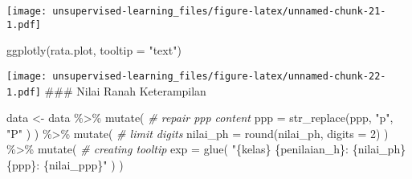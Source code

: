 \documentclass[
]{article}
\newenvironment{Shaded}{\begin{snugshade}}{\end{snugshade}}
\newcommand{\AttributeTok}[1]{\textcolor[rgb]{0.77,0.63,0.00}{#1}}
\newcommand{\CommentTok}[1]{\textcolor[rgb]{0.56,0.35,0.01}{\textit{#1}}}
\newcommand{\DecValTok}[1]{\textcolor[rgb]{0.00,0.00,0.81}{#1}}
\newcommand{\FunctionTok}[1]{\textcolor[rgb]{0.00,0.00,0.00}{#1}}
\newcommand{\NormalTok}[1]{#1}
\newcommand{\OtherTok}[1]{\textcolor[rgb]{0.56,0.35,0.01}{#1}}
\newcommand{\SpecialCharTok}[1]{\textcolor[rgb]{0.00,0.00,0.00}{#1}}
\newcommand{\StringTok}[1]{\textcolor[rgb]{0.31,0.60,0.02}{#1}}
\begin{document}
\texttt{[image: unsupervised-learning\_files/figure-latex/unnamed-chunk-21-1.pdf]}

\begin{Shaded}
\begin{Highlighting}[]
\FunctionTok{ggplotly}\NormalTok{(rata.plot, }\AttributeTok{tooltip =} \StringTok{"text"}\NormalTok{)}
\end{Highlighting}
\end{Shaded}

\texttt{[image: unsupervised-learning\_files/figure-latex/unnamed-chunk-22-1.pdf]}
\#\#\# Nilai Ranah Keterampilan

\begin{Shaded}
\begin{Highlighting}[]
\NormalTok{data }\OtherTok{\textless{}{-}}\NormalTok{ data }\SpecialCharTok{\%\textgreater{}\%} 
  \FunctionTok{mutate}\NormalTok{( }\CommentTok{\# repair ppp content}
    \AttributeTok{ppp =} \FunctionTok{str\_replace}\NormalTok{(ppp, }\StringTok{"p"}\NormalTok{, }\StringTok{"P"}\NormalTok{ ) }
\NormalTok{  ) }\SpecialCharTok{\%\textgreater{}\%} 
  \FunctionTok{mutate}\NormalTok{( }\CommentTok{\# limit digits}
    \AttributeTok{nilai\_ph =} \FunctionTok{round}\NormalTok{(nilai\_ph, }\AttributeTok{digits =} \DecValTok{2}\NormalTok{)}
\NormalTok{  ) }\SpecialCharTok{\%\textgreater{}\%} 
    \FunctionTok{mutate}\NormalTok{( }\CommentTok{\# creating tooltip}
    \AttributeTok{exp =} \FunctionTok{glue}\NormalTok{(}
      \StringTok{"\{kelas\} }
\StringTok{      \{penilaian\_h\}: \{nilai\_ph\}}
\StringTok{      \{ppp\}: \{nilai\_ppp\}"}
\NormalTok{    )}
\NormalTok{  )}
\end{Highlighting}
\end{Shaded}
\end{document}
